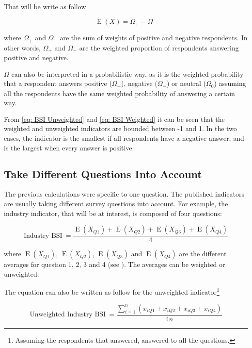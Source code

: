 \documentclass[12pt,a4paper,oneside]{book}
\DeclareMathOperator{\E}{E}
\begin{document}
That will be write as follow

\begin{equation}
    \E(X) = \Omega_+ - \Omega_- \label{eq: BSI Weighted}
\end{equation}

where $\Omega_+$ and $\Omega_-$ are the sum of weights of positive and negative respondents. 
In other words, $\Omega_+$ and $\Omega_-$ are the weighted proportion of respondents answering positive and negative. 

$\Omega$ can also be interpreted in a probabilistic way, as it is the weighted probability that a respondent answers positive ($\Omega_+$), negative ($\Omega_-$) or neutral ($\Omega_0$) assuming all the respondents have the same weighted probability of answering a certain way.

From \autoref{eq: BSI Unweighted} and \ref{eq: BSI Weighted} it can be seen that the weighted and unweighted indicators are bounded between -1 and 1. In the two cases, the indicator is the smallest if all respondents have a negative answer, and is the largest when every answer is positive.

\subsection{Take Different Questions Into Account}

The previous calculations were specific to one question. The published indicators are usually taking different survey questions into account. For example, the industry indicator, that will be at interest, is composed of four questions:

\begin{equation}
    \mbox{Industry BSI}\ = \frac{\E(X_{Q1}) + \E(X_{Q2}) + \E(X_{Q3}) + \E(X_{Q4})}{4}
\end{equation}

where 
$\E(X_{Q1})$, $\E(X_{Q2})$, $\E(X_{Q3})$ and $\E(X_{Q4})$ are the different averages for question 1, 2, 3 and 4 (see ). The averages can be weighted or unweighted.

The equation can also be written as follow for the unweighted indicator\footnote{Assuming the respondents that answered, answered to all the questions.}

\begin{equation}
    \mbox{Unweighted Industry BSI}\ = \frac{\sum^n_{i=1}(x_{iQ1} + x_{iQ2} + x_{iQ3} + x_{iQ4})}{4n} 
\end{equation} 
\end{document}

